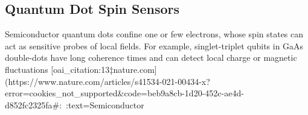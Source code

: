 \documentclass[12pt]{article}
\begin{document}
\subsection{Quantum Dot Spin Sensors}
Semiconductor quantum dots confine one or few electrons, whose spin states can act as sensitive probes of local fields.  For example, singlet-triplet qubits in GaAs double-dots have long coherence times and can detect local charge or magnetic fluctuations [oai_citation:13‡nature.com](https://www.nature.com/articles/s41534-021-00434-x?error=cookies_not_supported&code=beb9a8cb-1d20-452c-ae4d-d852fc2325fa#:~:text=Semiconductor%
\end{document}
